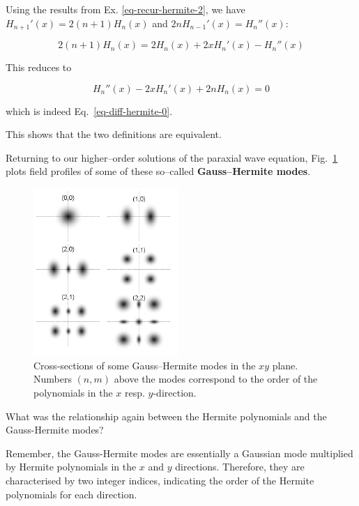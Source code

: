 Using the results from Ex. \ref{eq-recur-hermite-2}, we have $H_{n+1}'(x) = 2(n+1)H_n(x)$ and $2 n H_{n-1}'(x) = H_n''(x)$:

\begin{equation}
2(n+1)H_n(x) = 2  H_n(x) + 2 x H_n'(x)- H_n''(x)
\end{equation} 

This reduces to

\begin{equation}
H_n''(x) - 2 x H_n'(x) + 2n H_n(x) = 0 \label{eq-diff-hermite-1}
\end{equation} 

which is indeed Eq.~\ref{eq-diff-hermite-0}.

This shows that the two definitions are equivalent.

\pagebreak


Returning to our higher--order solutions of the paraxial wave equation, Fig.~\ref{fig-gauss-hermite} plots field profiles of some of these so--called \textbf{Gauss--Hermite modes}.

\begin{figure}
\centering
\includegraphics[width=5.5cm]{hermite/figures/gauss}
\caption{Cross-sections of some Gauss--Hermite modes in the $xy$ plane. Numbers $(n,m)$ above the modes correspond to the order of the polynomials in the $x$ resp. $y$-direction.}
\label{fig-gauss-hermite}
\end{figure}

\begin{cue}
What was the relationship again between the Hermite polynomials and the Gauss-Hermite modes?  
\end{cue}

Remember, the Gauss-Hermite modes are essentially a Gaussian mode multiplied by Hermite polynomials in the $x$ and $y$ directions. Therefore, they are characterised by two integer indices, indicating the order of the Hermite polynomials for each direction.

